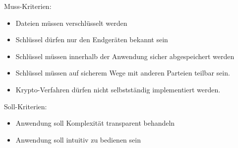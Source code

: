 \documentclass[10pt, a4paper]{scrreprt}
\begin{document}
Muss-Kriterien:
\begin{itemize}
\item Dateien müssen verschlüsselt werden
\item Schlüssel dürfen nur den Endgeräten bekannt sein
\item Schlüssel müssen innerhalb der Anwendung sicher abgespeichert werden
\item Schlüssel müssen auf sicherem Wege mit anderen Parteien teilbar sein.
\item Krypto-Verfahren dürfen nicht selbstständig implementiert werden.
\end{itemize}
Soll-Kriterien:
\begin{itemize}
\item Anwendung soll Komplexität transparent behandeln
\item Anwendung soll intuitiv zu bedienen sein
\end{itemize}
\end{document}
